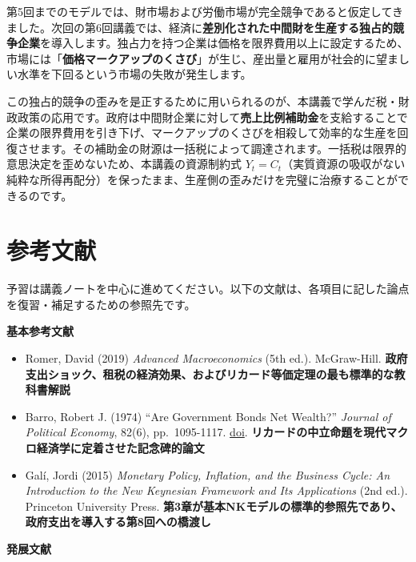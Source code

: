 \documentclass[
  japanese,
  lualatex,
  ja=standard,
  12pt,
  a4paper]{ltjsarticle}
\providecommand{\tightlist}{%
  \setlength{\itemsep}{0pt}\setlength{\parskip}{0pt}}
\begin{document}
第5回までのモデルでは、財市場および労働市場が完全競争であると仮定してきました。次回の第6回講義では、経済に\textbf{差別化された中間財を生産する独占的競争企業}を導入します。独占力を持つ企業は価格を限界費用以上に設定するため、市場には「\textbf{価格マークアップのくさび}」が生じ、産出量と雇用が社会的に望ましい水準を下回るという市場の失敗が発生します。

この独占的競争の歪みを是正するために用いられるのが、本講義で学んだ税・財政政策の応用です。政府は中間財企業に対して\textbf{売上比例補助金}を支給することで企業の限界費用を引き下げ、マークアップのくさびを相殺して効率的な生産を回復させます。その補助金の財源は一括税によって調達されます。一括税は限界的意思決定を歪めないため、本講義の資源制約式
\(Y_t = C_t\)（実質資源の吸収がない純粋な所得再配分）を保ったまま、生産側の歪みだけを完璧に治療することができるのです。

\clearpage

\section{参考文献}\label{ux53c2ux8003ux6587ux732e}

予習は講義ノートを中心に進めてください。以下の文献は、各項目に記した論点を復習・補足するための参照先です。

\textbf{基本参考文献}

\begin{itemize}
\tightlist
\item
  Romer, David (2019) \emph{Advanced Macroeconomics} (5th ed.).
  McGraw-Hill.
  \textbf{政府支出ショック、租税の経済効果、およびリカード等価定理の最も標準的な教科書解説}
\item
  Barro, Robert J. (1974) ``Are Government Bonds Net Wealth?''
  \emph{Journal of Political Economy}, 82(6), pp.~1095-1117.
  \href{https://doi.org/10.1086/260266}{doi}.
  \textbf{リカードの中立命題を現代マクロ経済学に定着させた記念碑的論文}
\item
  Galí, Jordi (2015) \emph{Monetary Policy, Inflation, and the Business
  Cycle: An Introduction to the New Keynesian Framework and Its
  Applications} (2nd ed.). Princeton University Press.
  \textbf{第3章が基本NKモデルの標準的参照先であり、政府支出を導入する第8回への橋渡し}
\end{itemize}

\textbf{発展文献}
\end{document}
